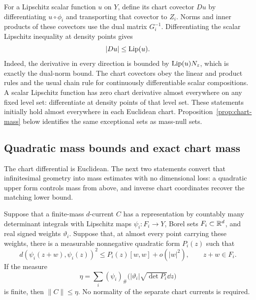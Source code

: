 For a Lipschitz scalar function \(u\) on \(Y\), define its chart covector
\(Du\) by differentiating \(u\circ\phi_i\) and transporting that covector
to \(Z_i\). Norms and inner products of these covectors use the dual
matrix \(G_i^{-1}\). Differentiating the scalar Lipschitz inequality at
density points gives
\begin{equation}
\label{eq:gradient-lipschitz}
 |Du|\le\operatorname{Lip}(u).
\end{equation}
Indeed, the derivative in every direction is bounded by
\(\operatorname{Lip}(u)N_z\), which is exactly the dual-norm bound. The chart covectors
obey the linear and product rules and the usual chain rule for continuously
differentiable scalar compositions. A scalar Lipschitz function has zero
chart derivative almost everywhere on any fixed level set: differentiate
at density points of that level set. These statements initially hold
almost everywhere in each Euclidean chart. Proposition~\ref{prop:chart-mass}
below identifies the same exceptional sets as mass-null sets.

\subsection{Quadratic mass bounds and exact chart mass}

The chart differential is Euclidean. The next two statements convert
that infinitesimal geometry into mass estimates with no dimensional
loss: a quadratic upper form controls mass from above, and inverse
chart coordinates recover the matching lower bound.

\begin{lemma}
\label{lem:quadratic-mass}
Suppose that a finite-mass \(d\)-current \(C\) has a representation by
countably many determinant integrals with Lipschitz maps
\(\psi_i:F_i\to Y\), Borel sets \(F_i\subset\mathbb R^d\), and real signed
weights \(\vartheta_i\). Suppose that, at almost every point carrying
these weights, there is a measurable nonnegative quadratic form
\(P_i(z)\) such that
\begin{equation}
\label{eq:quadratic-distance-majorant}
 d(\psi_i(z+w),\psi_i(z))^2
 \le P_i(z)[w,w]+o(|w|^2),\qquad z+w\in F_i.
\end{equation}
If the measure
\begin{equation}
\label{eq:quadratic-mass-majorant}
 \eta=\sum_i(\psi_i)_\#
       \bigl(|\vartheta_i|\sqrt{\det P_i}\dd z\bigr)
\end{equation}
is finite, then \(\|C\|\le\eta\). No normality of the separate chart
currents is required.
\end{lemma}

